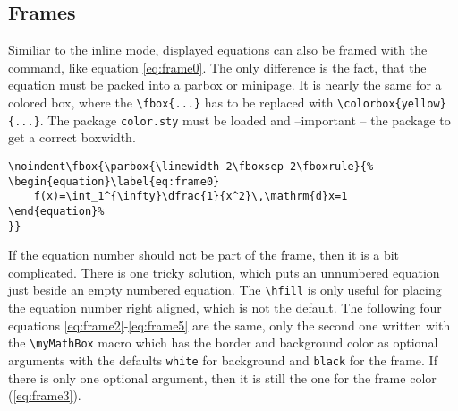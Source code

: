 \subsection{Frames}\label{sec:Frames}
Similiar to the inline mode, displayed equations can also be framed with
the  command, like equation \ref{eq:frame0}.
The only difference is
the fact, that the equation must be packed into a parbox or minipage. It is
nearly the same for a colored box, where the \verb|\fbox{...}| has to be
replaced with \verb|\colorbox{yellow}{...}|. The package \verb|color.sty| must
be loaded and --important -- the  package to get a correct boxwidth.

\noindent{}

\medskip
\begin{lstlisting}
\noindent\fbox{\parbox{\linewidth-2\fboxsep-2\fboxrule}{%
\begin{equation}\label{eq:frame0}
	f(x)=\int_1^{\infty}\dfrac{1}{x^2}\,\mathrm{d}x=1
\end{equation}%
}}
\end{lstlisting}


If the equation number should not be part of the frame, then it is a bit
complicated. There is one tricky solution, which puts an unnumbered equation
just beside an empty numbered equation. The \verb|\hfill| is only useful for
placing the equation number right aligned, which is not the default. The
following four equations \ref{eq:frame2}-\ref{eq:frame5} are the same,
only the second one written with the \verb|\myMathBox| macro which has the
border and background color as optional arguments with the defaults
\verb|white| for background and \verb|black| for the frame. If there is only
one optional argument, then it is still the one for the frame color (\ref{eq:frame3}).

\makeatletter
\def\myMathBox{\@ifnextchar[{\my@MBoxi}{\my@MBoxi[black]}}
\def\my@MBoxi[#1]{\@ifnextchar[{\my@MBoxii[#1]}{\my@MBoxii[#1][white]}}
\def\my@MBoxii[#1][#2]#3#4{%
  \par\noindent%
  \fcolorbox{#1}{#2}{%
     \parbox{\linewidth-\labelwidth-2\fboxrule-2\fboxsep}{#3}%
  }%
  \parbox{\labelwidth}{%
    \begin{eqnarray}\label{#4}\end{eqnarray}%
  }%
  \par%
}
\makeatother

